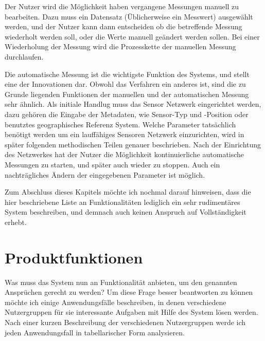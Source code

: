 Der Nutzer wird die Möglichkeit haben vergangene Messungen manuell zu bearbeiten. Dazu muss ein Datensatz (Üblicherweise ein Messwert) ausgewählt werden, und der Nutzer kann dann entscheiden ob die betreffende Messung wiederholt werden soll, oder die Werte manuell geändert werden sollen. Bei einer Wiederholung der Messung wird die Prozesskette der manuellen Messung durchlaufen.

Die automatische Messung ist die wichtigste Funktion des Systems, und stellt eine der Innovationen dar. Obwohl das Verfahren ein anderes ist, sind die zu Grunde liegenden Funktionen der manuellen und der automatischen Messung sehr ähnlich. Als initiale Handlug muss das Sensor Netzwerk eingerichtet werden, dazu gehören die Eingabe der Metadaten, wie Sensor-Typ und -Position oder benutztes geographisches Referenz System. Welche Parameter tatsächlich benötigt werden um ein lauffähiges Sensoren Netzwerk einzurichten, wird in später folgenden methodischen Teilen genauer beschrieben. Nach der Einrichtung des Netzwerkes hat der Nutzer die Möglichkeit kontinuierliche automatische Messungen zu starten, und später auch wieder zu stoppen. Auch ein nachträgliches Ändern der eingegebenen Parameter ist möglich.

Zum Abschluss dieses Kapitels möchte ich nochmal darauf hinweisen, dass die hier beschriebene Liste an Funktionalitäten lediglich ein sehr rudimentäres System beschreiben, und demnach auch keinen Anspruch auf Vollständigkeit erhebt.


\section{Produktfunktionen}
Was muss das System nun an Funktionalität anbieten, um den genannten Ansprüchen gerecht zu werden? Um diese Frage besser beantworten zu können möchte ich einige Anwendungsfälle beschreiben, in denen verschiedene Nutzergruppen für sie interessante Aufgaben mit Hilfe des System lösen werden. Nach einer kurzen Beschreibung der verschiedenen Nutzergruppen werde ich jeden Anwendungsfall in tabellarischer Form analysieren.

